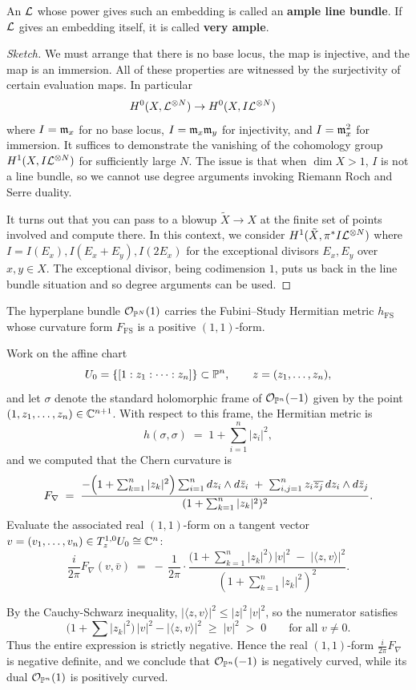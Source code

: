 \documentclass[12pt]{article}
\begin{document}
An $\cL$ whose power gives such an embedding is called an \textbf{ample line bundle}. If $\cL$ gives an embedding itself, it is called \textbf{very ample}.

\begin{proof}
    [Sketch] We must arrange that there is no base locus, the map is injective, and the map is an immersion. All of these properties are witnessed by the surjectivity of certain evaluation maps. In particular \begin{align*}
    H^0(X,\cL^{\otimes N}) &\to H^0(X,I \cL^{\otimes N}) 
    \end{align*} where $I = \mf{m}_x$ for no base locus, $I = \mf{m}_x \mf{m}_y$ for injectivity, and $I = \mf{m}_x^2$ for immersion. It suffices to demonstrate the vanishing of the cohomology group $H^1(X, I \cL^{\otimes N})$ for sufficiently large $N$. The issue is that when $\dim X > 1$, $I$ is not a line bundle, so we cannot use degree arguments invoking Riemann Roch and Serre duality.

It turns out that you can pass to a blowup $\tilde{X} \to X$ at the finite set of points involved and compute there. In this context, we consider $H^1(\tilde{X}, \pi^* I \cL^{\otimes N})$ where $I = I(E_x), I(E_x + E_y), I(2E_x)$ for the exceptional divisors $E_x, E_y$ over $x,y\in X$. The exceptional divisor, being codimension $1$, puts us back in the line bundle situation and so degree arguments can be used. 
\end{proof}

\begin{example}\label{ex:fubini-study}
    The hyperplane bundle $\cO_{\P^N}(1)$ carries the Fubini--Study Hermitian
metric $h_{\mathrm{FS}}$ whose curvature form $F_{\mathrm{FS}}$ is a
positive $(1,1)$-form.

Work on the affine chart
\[
U_0=\{[1:z_1:\dots:z_n]\}\subset\P^n,
\qquad z=(z_1,\dots,z_n),
\]
and let $\sigma$ denote the standard holomorphic frame of
$\mathcal O_{\P^n}(-1)$ given by the point $(1,z_1,\dots,z_n)\in\C^{n+1}$.
With respect to this frame, the Hermitian metric is
\[
h(\sigma,\sigma)\;=\;1+\sum_{i=1}^n |z_i|^2,
\]
and we computed that the Chern curvature is
\[
F_\nabla
 \;=\;
 \frac{
   -\Bigl(1+\textstyle\sum_{k=1}^n |z_k|^2\Bigr)
      \sum_{i=1}^n dz_i\wedge d\bar z_i
   \;+\;
   \sum_{i,j=1}^n z_i\overline{z_j}\,dz_i\wedge d\bar z_j}
 {(1+\sum_{k=1}^n |z_k|^2)^2}.
\]
Evaluate the associated real $(1,1)$-form on a
tangent vector $v=(v_1,\dots,v_n)\in T^{1,0}_zU_0\cong\C^n$:
\[
\frac{i}{2\pi}F_\nabla(v,\bar v)
 \;=\;
 -\,\frac{1}{2\pi}\cdot
   \frac{
     \bigl(1+\sum_{k=1}^n |z_k|^2\bigr)\,|v|^2
     \;-\;
     |\langle z,v\rangle|^2}
   {(1+\sum_{k=1}^n |z_k|^2)^2}.
\]

By the Cauchy-Schwarz inequality,
$|\langle z,v\rangle|^2 \le |z|^2\,|v|^2$, so the numerator satisfies
\[
\bigl(1+\sum |z_k|^2\bigr)\,|v|^2 - |\langle z,v\rangle|^2
 \;\ge\; |v|^2 \;>\;0
\qquad\text{for all } v\neq 0.
\]
Thus the entire expression is strictly negative.  Hence the real
$(1,1)$-form $\frac{i}{2\pi}F_\nabla$ is negative definite, and we conclude that 
$\mathcal O_{\P^n}(-1)$ is negatively curved, while its dual
$\mathcal O_{\P^n}(1)$ is positively curved.
\end{example}
\end{document}
